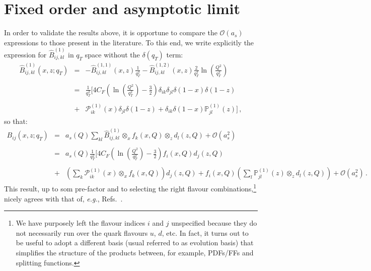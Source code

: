 \documentclass[10pt,a4paper]{article}
\begin{document}
\section{Fixed order and asymptotic limit}

In order to validate the results above, it is opportune to compare the
$\mathcal{O}(a_s)$ expressions to those present in the literature. To
this end, we write explicitly the expression for
$\hat{B}_{ij,kl}^{(1)}$ in $q_T$ space without the $\delta(q_T)$ term:
\begin{equation}
\begin{array}{rcl}
  \hat{B}_{ij,kl}^{(1)}(x,z;q_T) &=&\displaystyle 
                                     -\hat{B}_{ij,kl}^{(1,1)}(x,z)\frac{1}{q_T^2}
                                     -\hat{B}_{ij,kl}^{(1,2)}(x,z)\frac{2}{q_T^2}\ln\left(\frac{Q^2}{q_T^2}\right)\\
  \\
                                 &=&\displaystyle
                                     \frac{1}{q_T^2}\bigg[4C_F\left(\ln\left(\frac{Q^2}{q_T^2}\right)-\frac{3}{2}\right)\delta_{ik}\delta_{jl}\delta(1-x)\delta(1-z)\\
  \\
                                 &+&\displaystyle \mathcal{P}_{ik}^{(1)}(x)\delta_{jl}\delta(1-z) + \delta_{ik}\delta(1-x)\mathbb{P}_{jl}^{(1)}(z)\bigg]\,,
\end{array}
\end{equation}
so that:
\begin{equation}\label{eq:asymptfromres}
\begin{array}{rcl}
B_{ij}(x,z;q_T) &=&\displaystyle a_s(Q) \sum_{kl}\hat{B}_{ij,kl}^{(1)}\mathop{\otimes}_x
  f_k(x,Q)\mathop{\otimes}_zd_l(z,Q)+\mathcal{O}(a_s^2)\\
\\
&=&\displaystyle a_s(Q) \frac{1}{q_T^2}\bigg[4C_F\left(\ln\left(\frac{Q^2}{q_T^2}\right)-\frac{3}{2}\right) f_i(x,Q)d_j(z,Q)\\
\\
 &+&\displaystyle \left(\sum_{k}\mathcal{P}_{ik}^{(1)}(x) \mathop{\otimes}_x
  f_k(x,Q)\right)d_j(z,Q) + f_i(x,Q)\left(\sum_l\mathbb{P}_{jl}^{(1)}(z) \mathop{\otimes}_zd_l(z,Q)\right) +\mathcal{O}(a_s^2)\,.
\end{array}
\end{equation}
This result, up to som pre-factor and to selecting the right flavour
combinations,\footnote{We have purposely left the flavour indices $i$
  and $j$ unspecified because they do not necessarily run over the
  quark flavours $u$, $d$, etc. In fact, it turns out to be useful to
  adopt a different basis (usual referred to as evolution basis) that
  simplifies the structure of the products between, for example,
  PDFs/FFs and splitting functions.} nicely agrees with that of,
\textit{e.g.},
Refs.~\cite{Meng:1995yn,Nadolsky:1999kb,Collins:2016hqq}.
\end{document}
